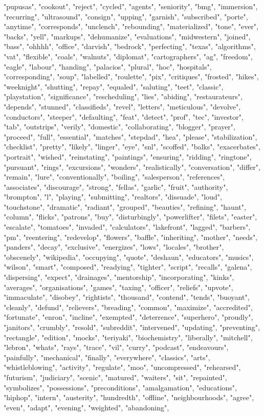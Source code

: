 "pupusas", "cookout", "reject", "cycled", "agents", "seniority", "bmg", "immersion", "recurring", "ultrasound", "consign", "upping", "garnish", "subscribed", "porte", "anytime", "corresponds", "unclench", "rebounding", "materialized", "tone", "ever", "backs", "yell", "markups", "dehumanize", "evaluations", "midwestern", "joined", "bass", "ohhhh", "office", "darvish", "bedrock", "perfecting", "texas", "algorithms", "vat", "flexible", "coals", "walnuts", "diplomat", "cartographers", "ag", "freedom", "eagle", "labour", "handing", "palacios", "plural", "hoc", "hospitals", "corresponding", "soup", "labelled", "roulette", "pix", "critiques", "frosted", "hikes", "weeknight", "shutting", "repay", "equaled", "saluting", "teet", "classic", "playstation", "significance", "rescheduling", "lies", "abiding", "restaurateurs", "depends", "stunned", "classifieds", "revel", "letters", "meticulous", "devolve", "conductors", "steeper", "defaulting", "feat", "detect", "prof", "tec", "investor", "tab", "outstrips", "verily", "domestic", "collaborating", "blogger", "prayer", "proceed", "full", "essential", "matches", "stepdad", "hea", "please", "stabilization", "checklist", "pretty", "likely", "linger", "eye", "snl", "scoffed", "balks", "exacerbates", "portrait", "wished", "reinstating", "paintings", "ensuring", "ridding", "ringtone", "pursuant", "rings", "excursions", "wonders", "realistically", "conversation", "differ", "remain", "lure", "conventionally", "boiling", "salesperson", "references", "associates", "discourage", "strong", "fellas", "garlic", "fruit", "authority", "brompton", "l", "playing", "submitting", "realtors", "dissuade", "loud", "touchstone", "dramatic", "radiant", "grouped", "beauties", "refining", "haunt", "column", "flicks", "patrons", "buy", "disturbingly", "powerlifter", "filets", "easter", "escalate", "tomatoes", "invaded", "calculators", "lakefront", "lagged", "barbers", "pm", "reentering", "redevelop", "flowers", "baffle", "inheriting", "mother", "needs", "panders", "decay", "exclusive", "energizes", "lows", "locales", "brother", "obscenely", "wikipedia", "occupying", "quote", "deshaun", "educators", "musics", "wilson", "smart", "composed", "readying", "tighter", "script", "recalls", "galena", "dispersing", "expect", "drainages", "mentorship", "incorporating", "kinks", "averages", "organisations", "games", "taxing", "officer", "reliefs", "upvote", "immaculate", "disobey", "rightists", "thousand", "contend", "tends", "buoyant", "cleanly", "defund", "relievers", "breading", "common", "maximize", "accredited", "fortunate", "enron", "incline", "exempted", "deterrence", "superhero", "proudly", "janitors", "crumbly", "resold", "subreddit", "intervened", "updating", "preventing", "rectangle", "edition", "mocks", "teriyaki", "biochemistry", "liberally", "mitchell", "lebron", "whats", "rays", "trace", "vil", "curry", "podcast", "endeavours", "painfully", "mechanical", "finally", "everywhere", "classics", "arts", "whistleblowing", "activity", "regulate", "moo", "uncompressed", "rehearsed", "futurism", "judiciary", "scenic", "matured", "waiters", "sit", "repainted", "symbolizes", "possessions", "preconditions", "amalgamation", "educations", "hiphop", "intern", "austerity", "hundredth", "offline", "neighbourhoods", "agree", "even", "adapt", "evening", "weighted", "abandoning", 